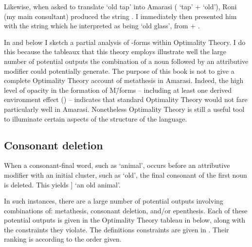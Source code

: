 Likewise, when asked to translate `old tap' into Amarasi ( `tap' +  `old'),
Roni (my main consultant) produced the string .
I immediately then presented him with the string 
which he interpreted as being `old glass', from  + .

In  and  below I sketch
a partial analysis of {\MC}-forms within Optimality Theory.
I do this because the tableaux that this theory employs
illustrate well the large number of potential outputs
the combination of a noun followed by an attributive
modifier could potentially generate.
The purpose of this book is not to give a
complete Optimality Theory account of metathesis in Amarasi.
Indeed, the high level of opacity in the formation of M\=/forms
-- including at least one derived environment effect () --
indicates that standard Optimality Theory
would not fare particularly well in Amarasi.
Nonetheless Optimality Theory is still a useful tool
to illuminate certain aspects of the structure of the language.

\subsection{Consonant deletion}\label{sec:ConDel/CC}
When a consonant-final word, such as  `animal',
occurs before an attributive modifier
with an initial cluster, such as  `old',
the final consonant of the first noun is deleted.
This yields   ] `an old animal'.

In such instances, there are a large number of potential
outputs involving combinations of: metathesis, consonant deletion, and/or epenthesis.
Each of these potential outputs is given in the Optimality Theory
tableau in  below, along with the constraints they violate.
The definitions constraints are given in .
Their ranking is according to the order given.

\begin{exe}
	\label{ex:Constraints}
\end{exe}

